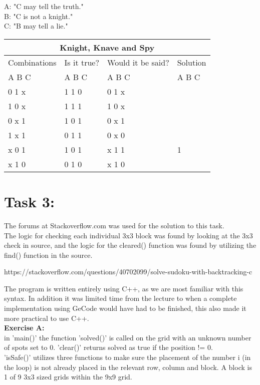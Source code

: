 \documentclass[11pt]{amsart}
\begin{document}
	A: "C may tell the truth."\\
	B: "C is not a knight."\\
	C: "B may tell a lie." \\


\begin{tabular}{ |p{3cm}||p{3cm}|p{3cm}|p{3cm}|  }
	\hline
	\multicolumn{4}{|c|}{Knight, Knave and Spy} \\
	\hline
	 Combinations & Is it true? & Would it be said? & Solution  \\ A  B  C   &   A  B  C  &   A  B  C & A  B  C \\
	\hline
	  0   1   x  	& 1	1	0   & 0 1 x	&  \\
	  1   0   x		& 1	1	1  	& 1 0 x &  \\
	  0   x   1 	&	1	0	1 	& 0 x 1	&  \\
	  1   x   1  	&	0	1	1 	& 0 x 0	&  \\
	  x   0   1		& 1	0	1  	& x 1 1	& 1\\
	  x   1   0		& 0	1	0  	& x 1 0 &  \\

	\hline
\end{tabular}


\section{Task 3:}

The forums at Stackoverflow.com was used for the solution to this task. \\

The logic for checking each individual 3x3 block was found by looking at the 3x3 check in source,
and the logic for the cleared() function was found by utilizing the find() function in the source.

\begin{thebibliography}{99}
https://stackoverflow.com/questions/40702099/solve-sudoku-with-backtracking-c
\end{thebibliography}

The program is written entirely using C++, as we are most familiar with this syntax.
In addition it was limited time from the lecture to when a complete
implementation using GeCode would have had to be finished, this also made it more practical to use C++. \\

\textbf{Exercise A:} \\

in 'main()' the function 'solved()' is called on the grid with an unknown number of
spots set to 0. 'clear()' returns solved as true if the position != 0. \\
'isSafe()' utilizes three functions to make sure the placement of the number i (in the loop) is
not already placed in the relevant row, column and block. A block is 1 of 9 3x3 sized grids within
the 9x9 grid. \\
\end{document}
